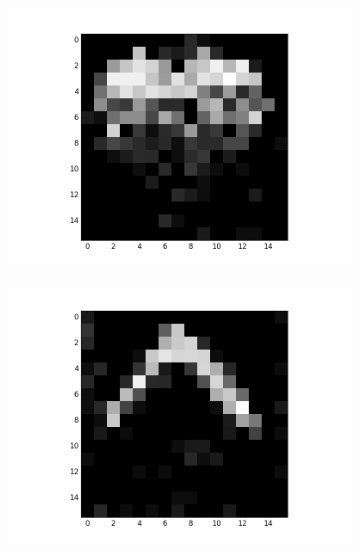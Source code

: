 \begin{figure}[h!]
\begin{subfigure}{.25\textwidth}
  		\includegraphics[width=\linewidth]{imgs/poker/compl31.png}
  		\label{fig:sub1}
	\end{subfigure}%
	\begin{subfigure}{.25\textwidth}
  		\centering
  		\includegraphics[width=\linewidth]{imgs/poker/compl41.png}
  		\label{fig:sub1}
	\end{subfigure}%
	

\end{figure}
